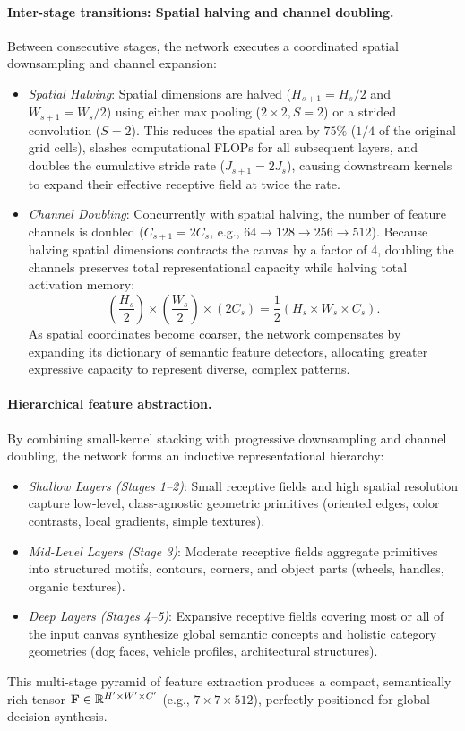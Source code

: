\paragraph{Inter-stage transitions: Spatial halving and channel doubling.}
Between consecutive stages, the network executes a coordinated spatial downsampling and channel expansion:
\begin{itemize}[leftmargin=*]
  \item \textit{Spatial Halving}: Spatial dimensions are halved ($H_{s+1} = H_s / 2$ and $W_{s+1} = W_s / 2$) using either max pooling ($2 \times 2, S=2$) or a strided convolution ($S=2$). This reduces the spatial area by $75\%$ ($1/4$ of the original grid cells), slashes computational FLOPs for all subsequent layers, and doubles the cumulative stride rate ($J_{s+1} = 2 J_s$), causing downstream kernels to expand their effective receptive field at twice the rate.
  \item \textit{Channel Doubling}: Concurrently with spatial halving, the number of feature channels is doubled ($C_{s+1} = 2 C_s$, e.g., $64 \to 128 \to 256 \to 512$). Because halving spatial dimensions contracts the canvas by a factor of 4, doubling the channels preserves total representational capacity while halving total activation memory:
    \begin{equation}
    \left(\frac{H_s}{2}\right) \times \left(\frac{W_s}{2}\right) \times (2 C_s) = \frac{1}{2} (H_s \times W_s \times C_s).
    \end{equation}
    As spatial coordinates become coarser, the network compensates by expanding its dictionary of semantic feature detectors, allocating greater expressive capacity to represent diverse, complex patterns.
\end{itemize}

\paragraph{Hierarchical feature abstraction.}
By combining small-kernel stacking with progressive downsampling and channel doubling, the network forms an inductive representational hierarchy:
\begin{itemize}[leftmargin=*]
  \item \textit{Shallow Layers (Stages 1--2)}: Small receptive fields and high spatial resolution capture low-level, class-agnostic geometric primitives (oriented edges, color contrasts, local gradients, simple textures).
  \item \textit{Mid-Level Layers (Stage 3)}: Moderate receptive fields aggregate primitives into structured motifs, contours, corners, and object parts (wheels, handles, organic textures).
  \item \textit{Deep Layers (Stages 4--5)}: Expansive receptive fields covering most or all of the input canvas synthesize global semantic concepts and holistic category geometries (dog faces, vehicle profiles, architectural structures).
\end{itemize}
This multi-stage pyramid of feature extraction produces a compact, semantically rich tensor $\mathbf{F} \in \mathbb{R}^{H' \times W' \times C'}$ (e.g., $7 \times 7 \times 512$), perfectly positioned for global decision synthesis.

